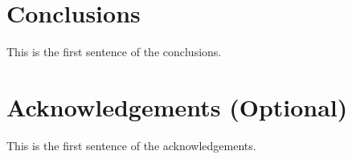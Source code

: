 \documentclass{madrid15WS}
\begin{document}
\section{Conclusions}

This is the first sentence of the conclusions.

\section{Acknowledgements (Optional)}

This is the first sentence of the acknowledgements.

%
%
% 


\end{document}
